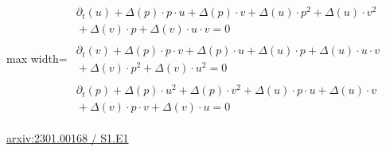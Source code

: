 \documentclass[UTF8,10pt,a4paper,fontset=mac]{ctexart}
\begin{document}
\begin{minipage}{\linewidth}\begin{center}\begin{adjustbox}{max width=\linewidth}$\displaystyle\begin{gathered}\begin{gathered}\partial_{t}(u)+\Delta(p)\cdot p\cdot u+\Delta(p)\cdot v+\Delta(u)\cdot p^{2}+\Delta(u)\cdot v^{2}\\[-1pt]{}+\Delta(v)\cdot p+\Delta(v)\cdot u\cdot v=0\end{gathered}\\[5pt]\begin{gathered}\partial_{t}(v)+\Delta(p)\cdot p\cdot v+\Delta(p)\cdot u+\Delta(u)\cdot p+\Delta(u)\cdot u\cdot v\\[-1pt]{}+\Delta(v)\cdot p^{2}+\Delta(v)\cdot u^{2}=0\end{gathered}\\[5pt]\begin{gathered}\partial_{t}(p)+\Delta(p)\cdot u^{2}+\Delta(p)\cdot v^{2}+\Delta(u)\cdot p\cdot u+\Delta(u)\cdot v\\[-1pt]{}+\Delta(v)\cdot p\cdot v+\Delta(v)\cdot u=0\end{gathered}\end{gathered}$\end{adjustbox}\end{center}{\small\href{https://arxiv.org/html/2301.00168#S1.E1}{arxiv:2301.00168 / S1.E1}}\par\end{minipage}\par\vspace{6mm}
\end{document}
